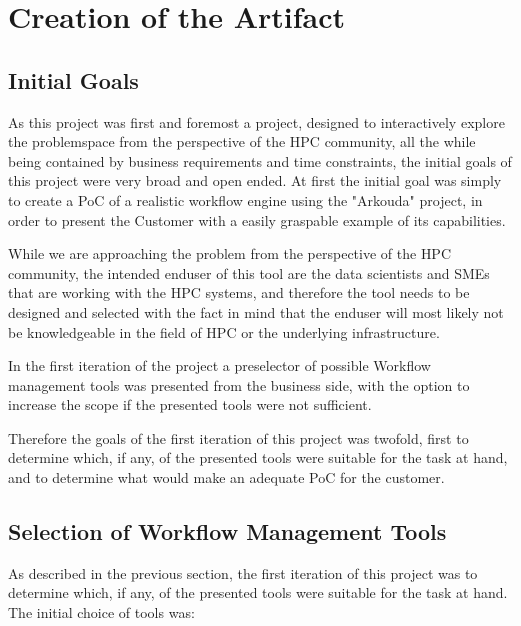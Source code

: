 \chapter{Creation of the Artifact}
\label{creation_of_the_artifact}

\section{Initial Goals}

As this project was first and foremost a project, designed to interactively explore the problemspace from the perspective of the \ac{HPC} community, 
all the while being contained by business requirements and time constraints, the initial goals of this project were very broad and open ended. 
At first the initial goal was simply to create a \ac{PoC} of a realistic workflow engine using the "Arkouda" project,
in order to present the Customer with a easily graspable example of its capabilities.

While we are approaching the problem from the perspective of the \ac{HPC} community, the intended enduser of this tool are the data scientists and \ac{SME}s 
that are working with the \ac{HPC} systems, and therefore the tool needs to be designed and selected with the fact in mind that the enduser will most likely not be knowledgeable in the field of \ac{HPC} or the underlying infrastructure.

In the first iteration of the project a preselector of possible Workflow management tools was presented from the business side,
with the option to increase the scope if the presented tools were not sufficient.

Therefore the goals of the first iteration of this project was twofold, first to determine which, if any, of the presented tools were suitable for the task at hand,
and to determine what would make an adequate \ac{PoC} for the customer.

\section{Selection of Workflow Management Tools}

As described in the previous section, the first iteration of this project was to determine which, if any, of the presented tools were suitable for the task at hand.
The initial choice of tools was:


